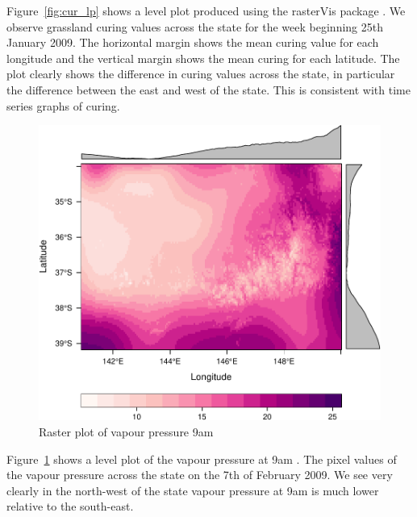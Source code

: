 \documentclass[11pt,a4paper]{article}
\begin{document}
Figure~\ref{fig:cur_lp} shows a level plot produced using the rasterVis package \citep{rastervis}. We observe grassland curing values across the state for the week beginning 25th January 2009. The horizontal margin shows the mean curing value for each longitude and the vertical margin shows the mean curing for each latitude. The plot clearly shows the difference in curing values across the state, in particular the difference between the east and west of the state. This is consistent with time series graphs of curing.

\begin{figure}
  \centering
	\includegraphics[width=.8\textwidth]{figures/vap_ras.pdf}
  \caption{Raster plot of vapour pressure 9am }
  \label{fig:vap_ras}
\end{figure}

Figure~\ref{fig:vap_ras} shows a level plot of the vapour pressure at 9am \citep{rastervis}. The pixel values of the vapour pressure across the state on the 7th of February 2009. We see very clearly in the north-west of the state vapour pressure at 9am is much lower relative to the south-east.
\end{document}
